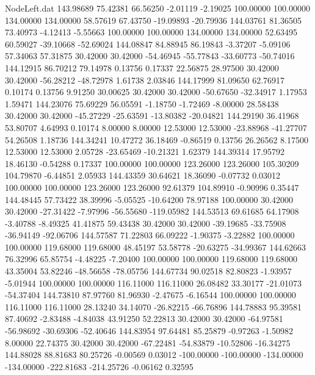 \begin{filecontents}{NodeLeft.dat}
 143.98689   75.42381   66.56250    -2.01119   -2.19025  100.00000  100.00000  134.00000  134.00000   58.57619   67.43750  -19.09893  -20.79936
 144.03761   81.36505   73.40973    -4.12413   -5.55663  100.00000  100.00000  134.00000  134.00000   52.63495   60.59027  -39.10668  -52.69024
 144.08847   84.88945   86.19843    -3.37207   -5.09106   57.34063   57.31875   30.42000   30.42000  -54.46945  -55.77843  -33.60773  -50.74016
 144.12915   86.70212   79.14978     0.13756    0.17337   22.56875   28.97500   30.42000   30.42000  -56.28212  -48.72978    1.61738    2.03846
 144.17999   81.09650   62.76917     0.10174    0.13756    9.91250   30.00625   30.42000   30.42000  -50.67650  -32.34917    1.17953    1.59471
 144.23076   75.69229   56.05591    -1.18750   -1.72469   -8.00000   28.58438   30.42000   30.42000  -45.27229  -25.63591  -13.80382  -20.04821
 144.29190   36.41968   53.80707     4.64993    0.10174    8.00000    8.00000   12.53000   12.53000  -23.88968  -41.27707   54.26508    1.18736
 144.34241   10.47272   36.18469    -0.86519    0.13756   26.26562    8.17500   12.53000   12.53000    2.05728  -23.65469  -10.21321    1.62379
 144.39314   17.95792   18.46130    -0.54288    0.17337  100.00000  100.00000  123.26000  123.26000  105.30209  104.79870   -6.44851    2.05933
 144.43359   30.64621   18.36090    -0.07732    0.03012  100.00000  100.00000  123.26000  123.26000   92.61379  104.89910   -0.90996    0.35447
 144.48445   57.73422   38.39996    -5.05525  -10.64200   78.97188  100.00000   30.42000   30.42000  -27.31422   -7.97996  -56.55680 -119.05982
 144.53513   69.61685   64.17908    -3.40788   -8.49325   41.41875   59.43438   30.42000   30.42000  -39.19685  -33.75908  -36.94149  -92.06706
 144.57587   71.22803   66.09222    -1.90375   -3.22882  100.00000  100.00000  119.68000  119.68000   48.45197   53.58778  -20.63275  -34.99367
 144.62663   76.32996   65.85754    -4.48225   -7.20400  100.00000  100.00000  119.68000  119.68000   43.35004   53.82246  -48.56658  -78.05756
 144.67734   90.02518   82.80823    -1.93957   -5.01944  100.00000  100.00000  116.11000  116.11000   26.08482   33.30177  -21.01073  -54.37404
 144.73810   87.97760   81.96930    -2.47675   -6.16544  100.00000  100.00000  116.11000  116.11000   28.13240   34.14070  -26.82215  -66.76896
 144.78883   95.39581   87.40692    -2.83488   -4.84038   43.91250   52.22813   30.42000   30.42000  -64.97581  -56.98692  -30.69306  -52.40646
 144.83954   97.64481   85.25879    -0.97263   -1.50982    8.00000   22.74375   30.42000   30.42000  -67.22481  -54.83879  -10.52806  -16.34275
 144.88028   88.81683   80.25726    -0.00569    0.03012 -100.00000 -100.00000 -134.00000 -134.00000 -222.81683 -214.25726   -0.06162    0.32595

\end{filecontents}
